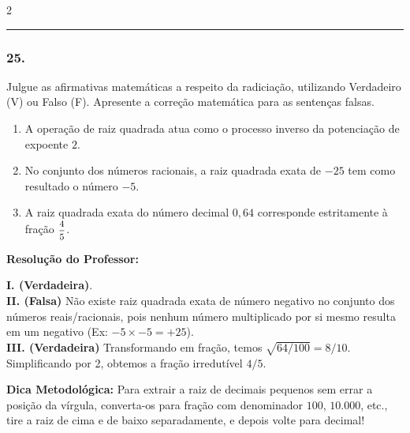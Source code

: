 \begin{multicols*}{2}
\par\vspace{\espacoQuestao}

\noindent\textcolor{CorLinha}{\rule{\linewidth}{0.5pt}} 
\par\vspace{\espacoPreQuestao}
\subsubsection*{25.} Julgue as afirmativas matemáticas a respeito da radiciação, utilizando Verdadeiro (V) ou Falso (F). Apresente a correção matemática para as sentenças falsas.
\begin{enumerate}[label=\Roman*., itemsep=\espacoAlt]
    \item A operação de raiz quadrada atua como o processo inverso da potenciação de expoente $ 2 $.
    \item No conjunto dos números racionais, a raiz quadrada exata de $ -25 $ tem como resultado o número $ -5 $.
    \item A raiz quadrada exata do número decimal $ 0,64 $ corresponde estritamente à fração $ \mfrac{4}{5} $.
\end{enumerate}

\ifgabarito
    \begin{tcolorbox}[colback=CorTitUm!5, colframe=CorTitUm, boxrule=1pt, arc=4pt, left=6pt, right=6pt, top=6pt, bottom=6pt]
    \small\textbf{\textcolor{CorTitUm}{Resolução do Professor:}}\par\vspace{0.1cm}
    \color{CinzaEscuro}
    \textbf{I. (Verdadeira)}.\\
    \textbf{II. (Falsa)} Não existe raiz quadrada exata de número negativo no conjunto dos números reais/racionais, pois nenhum número multiplicado por si mesmo resulta em um negativo (Ex: $-5 \times -5 = +25$).\\
    \textbf{III. (Verdadeira)} Transformando em fração, temos $ \sqrt{64/100} = 8/10 $. Simplificando por 2, obtemos a fração irredutível $ 4/5 $.
    \end{tcolorbox}
\fi

\par\vspace{\espacoQuestao}

\begin{boxdica}
\textbf{Dica Metodológica:} Para extrair a raiz de decimais pequenos sem errar a posição da vírgula, converta-os para fração com denominador $ 100 $, $ 10.000 $, etc., tire a raiz de cima e de baixo separadamente, e depois volte para decimal!
\end{boxdica}


\end{multicols*}
